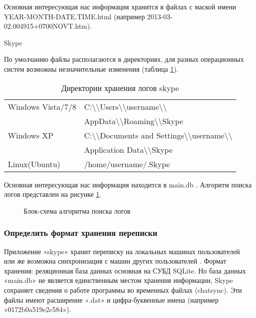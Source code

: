 Основная интересующая нас информация хранится в файлах с маской имени YEAR-MONTH-DATE.TIME.html (например 2013-03-02.004915+0700NOVT.htm).

Skype

По умолчанию файлы располагаются в директориях, для разных операционных систем возможны незначительные изменения (таблица \ref{tab:skype}). 

\begin{table}[h!]
\caption{Директории хранения логов skype}
\label{tab:skype}
\begin{tabularx}{\linewidth}{|l|X|}
\hline
Windows Vista/7/8 & C:\textbackslash\textbackslash  Users\textbackslash\textbackslash  username\textbackslash\textbackslash\\ &  AppData\textbackslash\textbackslash  Roaming\textbackslash\textbackslash  Skype\\
\hline
Windows XP & C:\textbackslash\textbackslash  Documents and Settings\textbackslash\textbackslash  username\textbackslash\textbackslash\\ &  Application Data\textbackslash\textbackslash  Skype\\
\hline
Linux(Ubuntu) & /home/username/.Skype\\
\hline
\end{tabularx}
\end{table}

Основная интересующая нас информация находится в main.db \cite{skypechat}. Алгоритм поиска логов представлен на рисунке \ref{pic:list_of_logs}.

\begin{figure}[h]
\caption{Блок-схема алгоритма поиска логов}
\label{pic:list_of_logs}
\end{figure}

\subsubsection{Определить формат хранения переписки}

Приложение «skype» хранит переписку на локальных машинах пользователей или же возможна синхронизация с машин других пользователей \cite{skypechat}. Формат хранения: реляционная база данных основная на СУБД SQLite.
Но база данных «main.db» не является единственным местом хранения информации, Skype сохраняет сведения о работе программы во временных файлах (chatsync). Эти файлы имеют расширение «.dat» и цифра-буквенные имена (например «0172b0a519e2c584»)\cite{cfl}.

